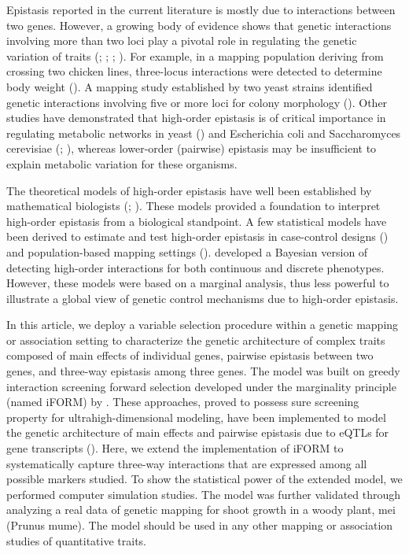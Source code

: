 \documentclass[]{book}
\theoremstyle{definition}
\theoremstyle{definition}
\theoremstyle{remark}
\begin{document}
Epistasis reported in the current literature is mostly due to
interactions between two genes. However, a growing body of evidence
shows that genetic interactions involving more than two loci play a
pivotal role in regulating the genetic variation of traits
(\cite{wang2010general}; \cite{dowell2010genotype};
\cite{pang2013statistical}; \cite{taylor2014genetic}). For example, in a
mapping population deriving from crossing two chicken lines, three-locus
interactions were detected to determine body weight
(\cite{pettersson2011replication}). A mapping study established by two
yeast strains identified genetic interactions involving five or more
loci for colony morphology (\cite{taylor2014genetic}). Other studies
have demonstrated that high-order epistasis is of critical importance in
regulating metabolic networks in yeast (\cite{weinreich2013should}) and
Escherichia coli and Saccharomyces cerevisiae
(\cite{imielinski2008exploiting}; \cite{he2010prevalent}), whereas
lower-order (pairwise) epistasis may be insufficient to explain
metabolic variation for these organisms.

The theoretical models of high-order epistasis have well been
established by mathematical biologists (\cite{hansen2001epistasis};
\cite{beerenwinkel2007analysis}). These models provided a foundation to
interpret high-order epistasis from a biological standpoint. A few
statistical models have been derived to estimate and test high-order
epistasis in case-control designs (\cite{wang2015bayesian}) and
population-based mapping settings (\cite{pang2013statistical}).
\cite{wang2015bayesian} developed a Bayesian version of detecting
high-order interactions for both continuous and discrete phenotypes.
However, these models were based on a marginal analysis, thus less
powerful to illustrate a global view of genetic control mechanisms due
to high-order epistasis.

In this article, we deploy a variable selection procedure within a
genetic mapping or association setting to characterize the genetic
architecture of complex traits composed of main effects of individual
genes, pairwise epistasis between two genes, and three-way epistasis
among three genes. The model was built on greedy interaction screening
forward selection developed under the marginality principle (named
iFORM) by \cite{hao2014interaction}. These approaches, proved to possess
sure screening property for ultrahigh-dimensional modeling, have been
implemented to model the genetic architecture of main effects and
pairwise epistasis due to eQTLs for gene transcripts
(\cite{gosik2016iform}). Here, we extend the implementation of iFORM to
systematically capture three-way interactions that are expressed among
all possible markers studied. To show the statistical power of the
extended model, we performed computer simulation studies. The model was
further validated through analyzing a real data of genetic mapping for
shoot growth in a woody plant, mei (Prunus mume). The model should be
used in any other mapping or association studies of quantitative traits.
\end{document}
